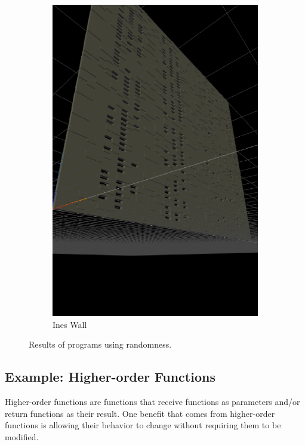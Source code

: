\begin{figure}
\begin{subfigure}[b]{0.3\linewidth}
    \includegraphics[width=1.0\linewidth]{./images/all_examples/ines_wall_crop}
    \caption{Ines Wall}
    \label{fig:ex:ines:wall}
  \end{subfigure}
  \caption{Results of programs using randomness.}
  \label{fig:rand:progs}
\end{figure}


\subsection{Example: Higher-order Functions}
Higher-order functions are functions that receive functions as parameters and/or return functions as their result.
One benefit that comes from higher-order functions is allowing their behavior to change without requiring them to be modified.

